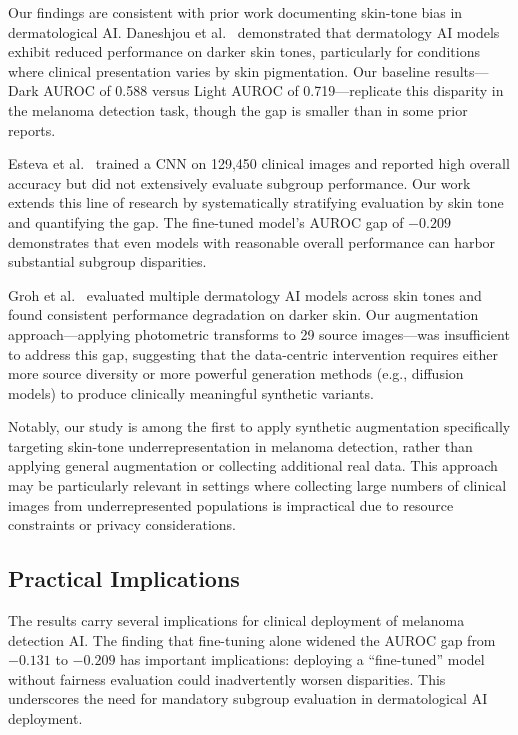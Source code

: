 Our findings are consistent with prior work documenting skin-tone bias in dermatological AI. Daneshjou et al.~\cite{Daneshjou2022} demonstrated that dermatology AI models exhibit reduced performance on darker skin tones, particularly for conditions where clinical presentation varies by skin pigmentation. Our baseline results---Dark AUROC of 0.588 versus Light AUROC of 0.719---replicate this disparity in the melanoma detection task, though the gap is smaller than in some prior reports.

Esteva et al.~\cite{Esteva2017} trained a CNN on 129,450 clinical images and reported high overall accuracy but did not extensively evaluate subgroup performance. Our work extends this line of research by systematically stratifying evaluation by skin tone and quantifying the gap. The fine-tuned model's AUROC gap of $-0.209$ demonstrates that even models with reasonable overall performance can harbor substantial subgroup disparities.

Groh et al.~\cite{Groh2021} evaluated multiple dermatology AI models across skin tones and found consistent performance degradation on darker skin. Our augmentation approach---applying photometric transforms to 29 source images---was insufficient to address this gap, suggesting that the data-centric intervention requires either more source diversity or more powerful generation methods (e.g., diffusion models) to produce clinically meaningful synthetic variants.

Notably, our study is among the first to apply synthetic augmentation specifically targeting skin-tone underrepresentation in melanoma detection, rather than applying general augmentation or collecting additional real data. This approach may be particularly relevant in settings where collecting large numbers of clinical images from underrepresented populations is impractical due to resource constraints or privacy considerations.

\subsection{Practical Implications}

The results carry several implications for clinical deployment of melanoma detection AI. The finding that fine-tuning alone widened the AUROC gap from $-0.131$ to $-0.209$ has important implications: deploying a ``fine-tuned'' model without fairness evaluation could inadvertently worsen disparities. This underscores the need for mandatory subgroup evaluation in dermatological AI deployment.

